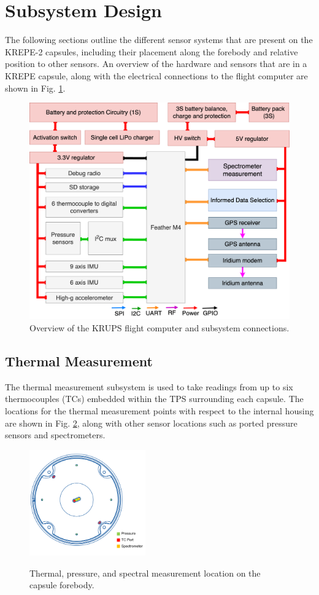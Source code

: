 \documentclass{article}
\begin{document}
\section{Subsystem Design}
\label{sec:subsystems}

The following sections outline the different sensor systems that are present on the KREPE-2 capsules, including their placement along the forebody and relative position to other sensors. An overview of the hardware and sensors that are in a KREPE capsule, along with the electrical connections to the flight computer are shown in Fig. \ref{fig:hardware-diagram}.

\begin{figure}[H]
    \centering
    \includegraphics[width=12cm]{images/krepe2-avionics-diagram.png}
    \caption{Overview of the KRUPS flight computer and subsystem connections.}
    \label{fig:hardware-diagram}
\end{figure}


\subsection{Thermal Measurement}
The thermal measurement subsystem is used to take readings from up to six thermocouples (TCs) embedded within the TPS surrounding each capsule.  The locations for the thermal measurement points with respect to the internal housing are shown in Fig. \ref{fig:sensor-locations}, along with other sensor locations such as ported pressure sensors and spectrometers.

\begin{figure}
\centering
\includegraphics[width=5cm]{images/tps_cad_highlight}
\label{fig:sensor-locations}
\caption{Thermal, pressure, and spectral measurement location on the capsule forebody.}
\end{figure}
\end{document}
